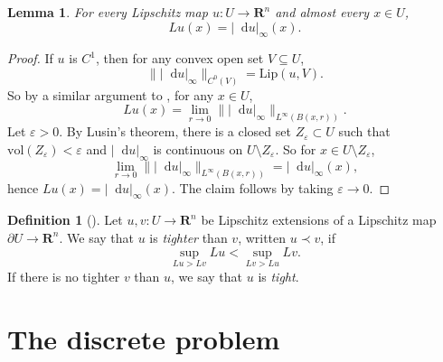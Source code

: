 \documentclass[reqno,11pt]{amsart}
\newcommand{\RR}{\mathbf{R}}
\newcommand*\dif{\mathop{}\!\mathrm{d}}
\newcommand{\vol}{\mathrm{vol}}
\newcommand{\Lip}{\mathrm{Lip}}
\newcommand{\dfn}[1]{\emph{#1}\index{#1}}
\newtheorem{lemma}[theorem]{Lemma}
\theoremstyle{definition}
\newtheorem{definition}[theorem]{Definition}
\numberwithin{equation}{section}
\begin{document}
\begin{lemma}\label{Lip is du}
For every Lipschitz map $u: U \to \RR^n$ and almost every $x \in U$,
$$Lu(x) = |\dif u|_\infty(x).$$
\end{lemma}
\begin{proof}
If $u$ is $C^1$, then for any convex open set $V \subseteq U$,
$$\||\dif u|_\infty\|_{C^0(V)} = \Lip(u, V).$$
So by a similar argument to \cite[Lemma 4.2(e)]{Crandall2008}, for any $x \in U$,
$$Lu(x) = \lim_{r \to 0} \||\dif u|_\infty\|_{L^\infty(B(x, r))}.$$
Let $\varepsilon > 0$.
By Lusin's theorem, there is a closed set $Z_\varepsilon \subset U$ such that $\vol(Z_\varepsilon) < \varepsilon$ and $|\dif u|_\infty$ is continuous on $U \setminus Z_\varepsilon$.
So for $x \in U \setminus Z_\varepsilon$,
$$\lim_{r \to 0} \||\dif u|_\infty\|_{L^\infty(B(x, r))} = |\dif u|_\infty(x),$$
hence $Lu(x) = |\dif u|_\infty(x)$.
The claim follows by taking $\varepsilon \to 0$.
\end{proof}

\begin{definition}[{\cite[\S1.3]{Sheffield12}}]
Let $u, v: U \to \RR^n$ be Lipschitz extensions of a Lipschitz map $\partial U \to \RR^n$.
We say that $u$ is \dfn{tighter} than $v$, written $u \prec v$, if 
$$\sup_{Lu > Lv} Lu < \sup_{Lv > Lu} Lv.$$
If there is no tighter $v$ than $u$, we say that $u$ is \dfn{tight}.
\end{definition}


\section{The discrete problem}
\end{document}
